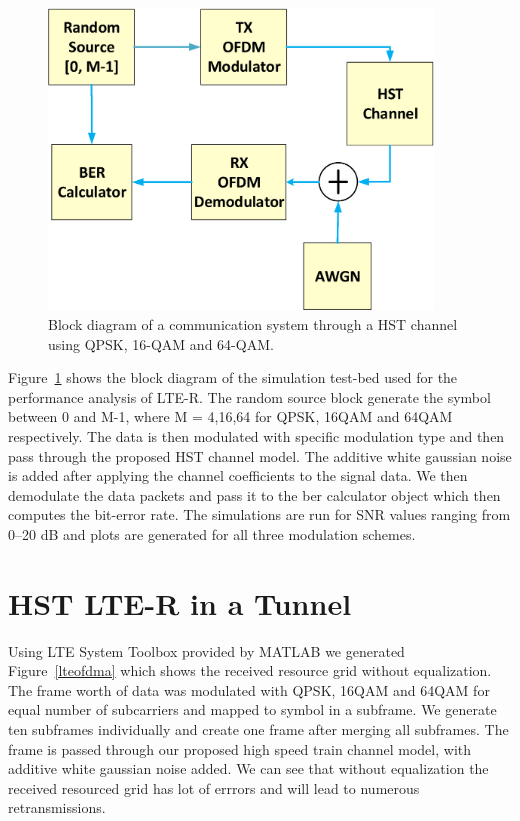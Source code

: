 \begin{figure}[!ht]
\label{finalblock}
\centering
\includegraphics[width=\textwidth,height=8cm,keepaspectratio]{images/Gill/lte_figs/finalblock.eps} 
\caption{Block diagram of a communication system through a HST channel using QPSK, 16-QAM and 64-QAM.}
\end{figure}

Figure~\ref{finalblock} shows the block diagram of the simulation test-bed used for the performance analysis of LTE-R. The random source block generate the symbol between 0 and M-1, where M = 4,16,64 for QPSK, 16QAM and 64QAM respectively. The data is then modulated with specific modulation type and then pass through the proposed HST channel model. The additive white gaussian noise is added after applying the channel coefficients to the signal data. We then demodulate the data packets and pass it to the ber calculator object which then computes the bit-error rate. The simulations are run for SNR values ranging from 0--20 dB and plots are generated for all three modulation schemes.

\section{HST LTE-R in a Tunnel}
Using LTE System Toolbox provided by MATLAB we generated Figure~\ref{lteofdma} which shows the received resource grid without equalization. The frame worth of data was modulated with QPSK, 16QAM and 64QAM for equal number of subcarriers and mapped to symbol in a subframe. We generate ten subframes individually and create one frame after merging all subframes. The frame is passed through our proposed high speed train channel model, with additive white gaussian noise added. We can see that without equalization the received resourced grid has lot of errrors and will lead to numerous retransmissions.

